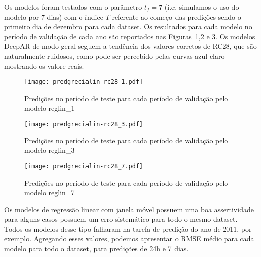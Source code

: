 Os modelos foram testados com o parâmetro $t_f = 7$ (i.e. simulamos o uso do
modelo por 7 dias) com o índice $T$ referente
ao começo das predições sendo o primeiro dia de dezembro para cada dataset.
Os resultados para cada modelo no período de validação de cada ano são
reportados nas Figuras~\ref{fig:rc281preds},\ref{fig:rc283preds} e
\ref{fig:rc287preds}. Os modelos DeepAR de modo geral seguem a tendência dos
valores corretos de RC28, que são naturalmente ruidosos, como pode ser
percebido pelas curvas azul claro mostrando os valore reais. 

\begin{figure}[H]
  \centering
  \texttt{[image: predgrecialin-rc28\_1.pdf]}
  \caption{Predições no período de teste para cada período de validação pelo
    modelo reglin\_1}
  \label{fig:rc281preds}
\end{figure}

\begin{figure}[H]
  \centering
  \texttt{[image: predgrecialin-rc28\_3.pdf]}
  \caption{Predições no período de teste para cada período de validação pelo
    modelo reglin\_3}
  \label{fig:rc283preds}

\end{figure}
\begin{figure}[H]
  \centering
  \texttt{[image: predgrecialin-rc28\_7.pdf]}
  \caption{Predições no período de teste para cada período de validação pelo
    modelo reglin\_7}
  \label{fig:rc287preds}

\end{figure}

Os modelos de regressão linear com janela móvel possuem uma boa assertividade
para alguns casos possuem um erro sistemático para todo o mesmo dataset. Todos
os modelos desse tipo falharam na tarefa de predição do ano de 2011, por exemplo.
Agregando esses valores, podemos apresentar o RMSE médio para cada modelo para
todo o dataset, para predições de 24h e 7 dias.


